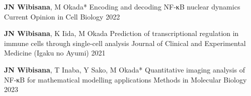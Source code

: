 \begin{cventries}

  \cventrypub
    {\textbf{JN Wibisana}, M Okada*} %
    {Encoding and decoding NF-κB nuclear dynamics} %
    {Current Opinion in Cell Biology} %
    {2022} %

  \cventrypublast
    {\textbf{JN Wibisana}, K Iida, M Okada} %
    {Prediction of transcriptional regulation in immune cells through single-cell analysis} %
    {Journal of Clinical and Experimental Medicine (Igaku no Ayumi)} %
    {2021} %


\end{cventries}
  


\begin{cventries}

  \cventrypublast
    {\textbf{JN Wibisana}, T Inaba, Y Sako, M Okada*} %
    {Quantitative imaging analysis of NF-κB for mathematical modelling applications} %
    {Methods in Molecular Biology} %
    {2023} %


\end{cventries}